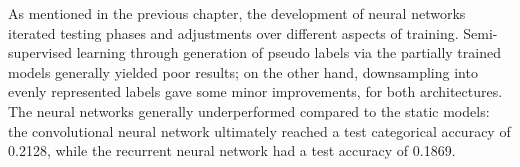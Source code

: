 
As mentioned in the previous chapter, the development of neural networks
iterated testing phases and adjustments over different aspects of training.
Semi-supervised learning through generation of pseudo labels via the partially
trained models generally yielded poor results; on the other hand, downsampling
into evenly represented labels gave some minor improvements, for both architectures.
The neural networks generally underperformed compared to the static models:
the convolutional neural network ultimately reached a test categorical accuracy
of 0.2128, while the recurrent neural network had a test accuracy of 0.1869.\\

